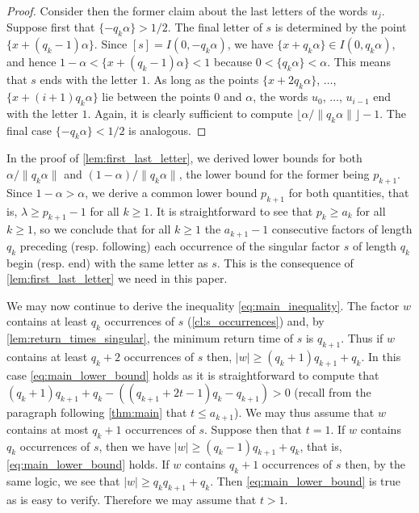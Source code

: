 \documentclass[a4paper,fleqn]{article}
\providecommand{\abs}[1]{\lvert#1\rvert}
\providecommand{\norm}[1]{\lVert#1\rVert}
\providecommand{\floor}[1]{\lfloor#1\rfloor}
\begin{document}
\begin{proof}
    Consider then the former claim about the last letters of the words $u_j$. Suppose first that
    $\{-q_k\alpha\} > 1/2$. The final letter of $s$ is determined by the point $\{x + (q_k - 1)\alpha\}$. Since
    $[s] = I(0, -q_k\alpha)$, we have $\{x + q_k\alpha\} \in I(0, q_k\alpha)$, and hence
    $1 - \alpha < \{x + (q_k - 1)\alpha\} < 1$ because $0 < \{q_k\alpha\} < \alpha$. This means that $s$ ends with the
    letter $1$. As long as the points $\{x + 2q_k\alpha\}$, $\ldots$, $\{x + (i + 1)q_k\alpha\}$ lie between the points
    $0$ and $\alpha$, the words $u_0$, $\ldots$, $u_{i-1}$ end with the letter $1$. Again, it is clearly sufficient to
    compute $\floor{\alpha/\norm{q_k\alpha}} - 1$. The final case $\{-q_k\alpha\} < 1/2$ is analogous.
  \end{proof}

  \begin{remark}\label{rem:weak_consequence}
    In the proof of \autoref{lem:first_last_letter}, we derived lower bounds for both $\alpha/\norm{q_k\alpha}$ and
    $(1 - \alpha)/\norm{q_k\alpha}$, the lower bound for the former being $p_{k+1}$. Since $1 - \alpha > \alpha$, we
    derive a common lower bound $p_{k+1}$ for both quantities, that is, $\lambda \geq p_{k+1} - 1$ for all $k \geq 1$.
    It is straightforward to see that $p_k \geq a_k$ for all $k \geq 1$, so we conclude that for all $k \geq 1$ the
    $a_{k+1} - 1$ consecutive factors of length $q_k$ preceding (resp. following) each occurrence of the singular factor
    $s$ of length $q_k$ begin (resp. end) with the same letter as $s$. This is the consequence of
    \autoref{lem:first_last_letter} we need in this paper.
  \end{remark}

  We may now continue to derive the inequality \eqref{eq:main_inequality}. The factor $w$ contains at least $q_k$
  occurrences of $s$ (\autoref{cl:s_occurrences}) and, by \autoref{lem:return_times_singular}, the minimum return time
  of $s$ is $q_{k+1}$. Thus if $w$ contains at least $q_k + 2$ occurrences of $s$ then,
  $\abs{w} \geq (q_k + 1)q_{k+1} + q_k$. In this case \eqref{eq:main_lower_bound} holds as it is straightforward to
  compute that $(q_k + 1)q_{k+1} + q_k - ((q_{k+1} + 2t - 1)q_k - q_{k+1}) > 0$ (recall from the paragraph following
  \autoref{thm:main} that $t \leq a_{k+1}$). We may thus assume that $w$ contains
  at most $q_k + 1$ occurrences of $s$. Suppose then that $t = 1$. If $w$ contains $q_k$ occurrences of $s$, then we
  have $\abs{w} \geq (q_k - 1)q_{k+1} + q_k$, that is, \eqref{eq:main_lower_bound} holds. If $w$ contains $q_k + 1$
  occurrences of $s$ then, by the same logic, we see that $\abs{w} \geq q_k q_{k+1} + q_k$. Then
  \eqref{eq:main_lower_bound} is true as is easy to verify. Therefore we may assume that $t > 1$.
\end{document}
